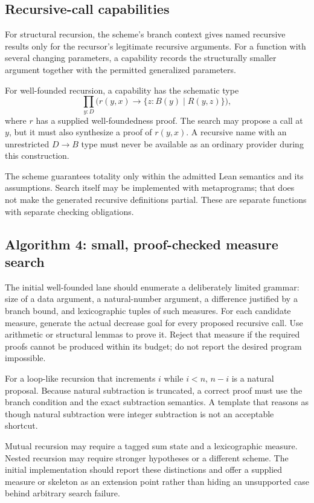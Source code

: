 \documentclass[11pt,letterpaper]{article}
\newcommand{\code}[1]{\texttt{\detokenize{#1}}}
\theoremstyle{definition}\newtheorem{definition}[theorem]{Definition}
\theoremstyle{remark}\newtheorem{remark}[theorem]{Remark}
\begin{document}
\subsection{Recursive-call capabilities}

For structural recursion, the scheme's branch context gives named recursive
results only for the recursor's legitimate recursive arguments. For a function
with several changing parameters, a capability records the structurally smaller
argument together with the permitted generalized parameters.

For well-founded recursion, a capability has the schematic type
\[
 \prod_{y:D}\bigl(r(y,x)\to\{z:B(y)\mid R(y,z)\}\bigr),
\]
where $r$ has a supplied well-foundedness proof. The search may propose a call at
$y$, but it must also synthesize a proof of $r(y,x)$. A recursive name with an
unrestricted $D\to B$ type must never be available as an ordinary provider during
this construction.

The scheme guarantees totality only within the admitted Lean semantics and its
assumptions. Search itself may be implemented with \code{partial} metaprograms;
that does not make the generated recursive definitions partial. These are
separate functions with separate checking obligations.

\subsection{Algorithm 4: small, proof-checked measure search}

The initial well-founded lane should enumerate a deliberately limited grammar:
size of a data argument, a natural-number argument, a difference justified by a
branch bound, and lexicographic tuples of such measures. For each candidate
measure, generate the actual decrease goal for every proposed recursive call.
Use arithmetic or structural lemmas to prove it. Reject that measure if the
required proofs cannot be produced within its budget; do not report the desired
program impossible.

For a loop-like recursion that increments $i$ while $i<n$, $n-i$ is a natural
proposal. Because natural subtraction is truncated, a correct proof must use the
branch condition and the exact subtraction semantics. A template that reasons as
though natural subtraction were integer subtraction is not an acceptable
shortcut.

Mutual recursion may require a tagged sum state and a lexicographic measure.
Nested recursion may require stronger hypotheses or a different scheme. The
initial implementation should report these distinctions and offer a supplied
measure or skeleton as an extension point rather than hiding an unsupported case
behind arbitrary search failure.
\end{document}
